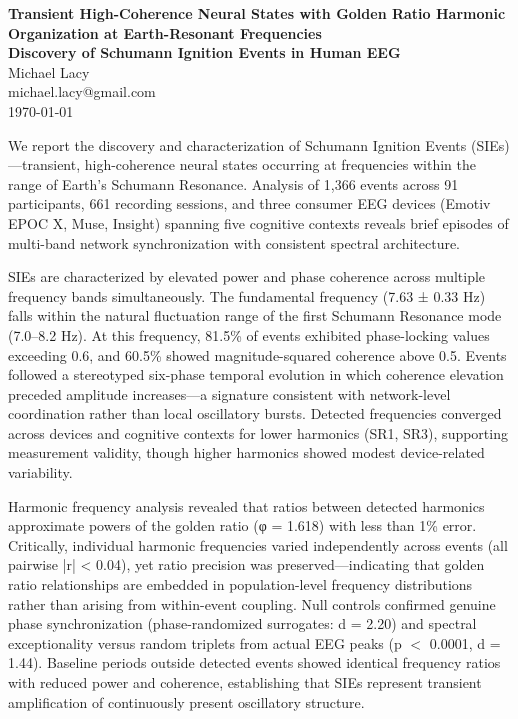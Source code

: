 \documentclass[11pt,a4paper]{article}
\begin{document}
\begin{center}
{\LARGE \textbf{Transient High-Coherence Neural States with Golden Ratio Harmonic Organization at Earth-Resonant Frequencies}}\\[0.5cm]
{\large \textbf{Discovery of Schumann Ignition Events in Human EEG}}\\[1cm]

{\large Michael Lacy}\\[0.5cm]
{\small michael.lacy@gmail.com}\\[0.5cm]

\today
\end{center}

\vspace{0.5cm}

We report the discovery and characterization of Schumann Ignition Events (SIEs)—transient, high-coherence neural states occurring at frequencies within the range of Earth's Schumann Resonance. Analysis of 1,366 events across 91 participants, 661 recording sessions, and three consumer EEG devices (Emotiv EPOC X, Muse, Insight) spanning five cognitive contexts reveals brief episodes of multi-band network synchronization with consistent spectral architecture.

SIEs are characterized by elevated power and phase coherence across multiple frequency bands simultaneously. The fundamental frequency (7.63 ± 0.33 Hz) falls within the natural fluctuation range of the first Schumann Resonance mode (7.0–8.2 Hz). At this frequency, 81.5\% of events exhibited phase-locking values exceeding 0.6, and 60.5\% showed magnitude-squared coherence above 0.5. Events followed a stereotyped six-phase temporal evolution in which coherence elevation preceded amplitude increases—a signature consistent with network-level coordination rather than local oscillatory bursts. Detected frequencies converged across devices and cognitive contexts for lower harmonics (SR1, SR3), supporting measurement validity, though higher harmonics showed modest device-related variability.

Harmonic frequency analysis revealed that ratios between detected harmonics approximate powers of the golden ratio (φ = 1.618) with less than 1\% error. Critically, individual harmonic frequencies varied independently across events (all pairwise |r| < 0.04), yet ratio precision was preserved—indicating that golden ratio relationships are embedded in population-level frequency distributions rather than arising from within-event coupling. Null controls confirmed genuine phase synchronization (phase-randomized surrogates: d = 2.20) and spectral exceptionality versus random triplets from actual EEG peaks (p $<$ 0.0001, d = 1.44). Baseline periods outside detected events showed identical frequency ratios with reduced power and coherence, establishing that SIEs represent transient amplification of continuously present oscillatory structure.
\end{document}
